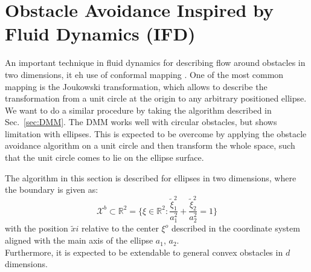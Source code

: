 \section{Obstacle Avoidance Inspired by Fluid Dynamics (IFD)} \label{sec:IFD}
An important technique in fluid dynamics for describing flow around obstacles in two dimensions, it eh use of conformal mapping \cite{milne1996theoretical,feder1997real}. One of the most common mapping is the Joukowski transformation, which allows to describe the transformation from a unit circle at the origin to any arbitrary positioned ellipse. We want to do a similar procedure by taking the algorithm described in Sec.~\ref{sec:DMM}. The DMM works well with circular obstacles, but shows limitation with ellipses. This is expected to be overcome by applying the obstacle avoidance algorithm on a unit circle and then transform the whole space, such that the unit circle comes to lie on the ellipse surface.



The algorithm in this section is described for ellipses in two dimensions, where the boundary is given as:
\begin{equation}
\mathcal{X}^b \subset \mathbb{R}^2 = \{ \xi \in \mathbb{R}^2 : \frac{\tilde \xi_1^2}{a_1^2} + \frac{\tilde \xi_2^2}{a_2^2} = 1 \} \label{eq:ellipse_2d}
\end{equation}
with the position $\tilde xi$ relative to the center $\xi^o$ described in the coordinate system aligned with the main axis of the ellipse $a_1$, $a_2$.\\
Furthermore, it is expected to be extendable to general convex obstacles in $d$ dimensions. %

